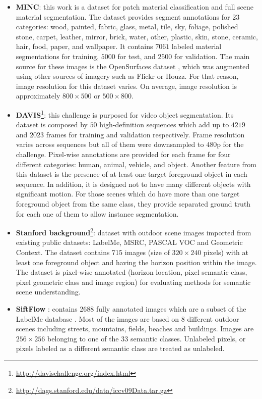 \begin{itemize}
	\item \textbf{\ac{MINC}}\cite{Bell2015}: this work is a dataset for patch material classification and full scene material segmentation. The dataset provides segment annotations for $23$ categories: wood, painted, fabric, glass, metal, tile, sky, foliage, polished stone, carpet, leather, mirror, brick, water, other, plastic, skin, stone, ceramic, hair, food, paper, and wallpaper. It contains $7061$ labeled material segmentations for training, $5000$ for test, and $2500$ for validation. The main source for these images is the OpenSurfaces dataset \cite{Bell2013}, which was augmented using other sources of imagery such as Flickr or Houzz. For that reason, image resolution for this dataset varies. On average, image resolution is approximately  $800\times500$ or $500\times800$.
	\item \textbf{\ac{DAVIS}}\cite{Perazzi2016}\cite{Pont-Tuset2017}\footnote{\url{http://davischallenge.org/index.html}}: this challenge is purposed for video object segmentation. Its dataset is composed by $50$ high-definition sequences which add up to $4219$ and $2023$ frames for training and validation respectively. Frame resolution varies across sequences but all of them were downsampled to $480$p for the challenge. Pixel-wise annotations are provided for each frame for four different categories: human, animal, vehicle, and object. Another feature from this dataset is the presence of at least one target foreground object in each sequence. In addition, it is designed not to have many different objects with significant motion. For those scenes which do have more than one target foreground object from the same class, they provide separated ground truth for each one of them to allow instance segmentation.
	\item \textbf{Stanford background}\cite{Gould2009}\footnote{\url{http://dags.stanford.edu/data/iccv09Data.tar.gz}}: dataset with outdoor scene images imported from existing public datasets: LabelMe, MSRC, PASCAL VOC and Geometric Context. The dataset contains 715 images (size of $320\times240$ pixels)  with at least one foreground object and having the horizon position within the image. The dataset is pixel-wise annotated (horizon location, pixel semantic class, pixel geometric class and image region) for evaluating methods for semantic scene understanding.
	\item \textbf{SiftFlow} \cite{Liu2009}: contains 2688 fully annotated images which are a subset of the LabelMe database \cite{Russell2008}. Most of the images are based on 8 different outdoor scenes including streets, mountains, fields, beaches and buildings. Images are $256\times256$ belonging to one of the 33 semantic classes. Unlabeled pixels, or pixels labeled as a different semantic class are treated as unlabeled. 
\end{itemize}


